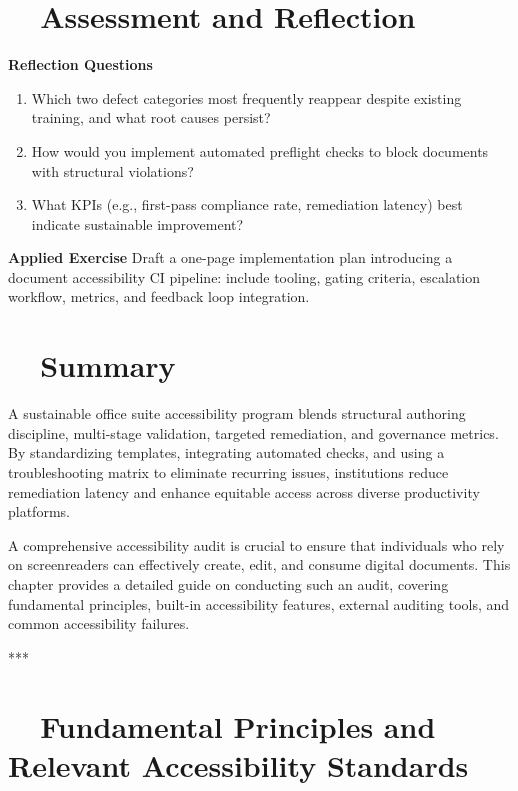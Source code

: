 \section{~~Assessment and Reflection}\label{ch20:sec:assessment-reflection}
\textbf{Reflection Questions}
\begin{enumerate}
	\item Which two defect categories most frequently reappear despite existing training, and what root causes persist?
	\item How would you implement automated preflight checks to block documents with structural violations?
	\item What KPIs (e.g., first-pass compliance rate, remediation latency) best indicate sustainable improvement?
\end{enumerate}
\textbf{Applied Exercise} Draft a one-page implementation plan introducing a document accessibility CI pipeline: include tooling, gating criteria, escalation workflow, metrics, and feedback loop integration.

\section{~~Summary}\label{ch20:sec:summary}
A sustainable office suite accessibility program blends structural authoring discipline, multi-stage validation, targeted remediation, and governance metrics. By standardizing templates, integrating automated checks, and using a troubleshooting matrix to eliminate recurring issues, institutions reduce remediation latency and enhance equitable access across diverse productivity platforms.

\label{cha:comprehensive-accessibility-audit-of-office-suites-for-screen-reader-accessibility}

A comprehensive \gls{accessibility} audit is crucial to ensure that individuals who rely on \gls{screenreader}s can effectively create, edit, and consume digital documents. This chapter provides a detailed guide on conducting such an audit, covering fundamental principles, built-in accessibility features, external auditing tools, and common accessibility failures.

***

\section{~~Fundamental Principles and Relevant Accessibility Standards}
\label{sec:fundamental-principles-and-relevant-accessibility-standards}


